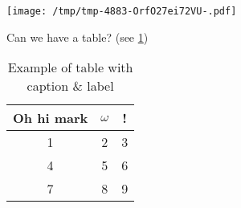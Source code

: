 \documentclass[12pt,russian,a4paper,,fleqn]{extarticle}
\newenvironment{Shaded}{}{}
\newcommand{\AttributeTok}[1]{\textcolor[rgb]{0.49,0.56,0.16}{#1}}
\newcommand{\ControlFlowTok}[1]{\textcolor[rgb]{0.00,0.44,0.13}{\textbf{#1}}}
\newcommand{\DecValTok}[1]{\textcolor[rgb]{0.25,0.63,0.44}{#1}}
\newcommand{\KeywordTok}[1]{\textcolor[rgb]{0.00,0.44,0.13}{\textbf{#1}}}
\newcommand{\NormalTok}[1]{#1}
\newcommand{\OperatorTok}[1]{\textcolor[rgb]{0.40,0.40,0.40}{#1}}
\newcommand{\SpecialCharTok}[1]{\textcolor[rgb]{0.25,0.44,0.63}{#1}}
\newcommand{\StringTok}[1]{\textcolor[rgb]{0.25,0.44,0.63}{#1}}
\let\origfigure=\figure
\let\endorigfigure=\endfigure
\renewenvironment{figure}[1][]{%
\origfigure[H]
}{%
\endorigfigure
}
\theoremstyle{definition}\newtheorem{definition}{Определение}
\theoremstyle{remark}\newtheorem*{remark}{Примечание}
\numberwithin{equation}{section}
\begin{document}
\begin{figure}
\hypertarget{fig:plot-example}{%
\centering
\texttt{[image: /tmp/tmp-4883-OrfO27ei72VU-.pdf]}
\caption{Example of plot with caption \& label}\label{fig:plot-example}
}
\end{figure}

Can we have a table? (see \ref{table:example-table})

\begin{Shaded}
\end{Shaded}

\begin{table}[ht]
\centering
\begin{tabular}[t]{|c|c|c|}
\hline
Oh hi mark & $\omega$ & !\\
\hline
1 & 2 & 3\\
\hline
4 & 5 & 6\\
\hline
7 & 8 & 9\\
\hline
\end{tabular}
\caption{
\label{table:example-table}
Example of table with caption \& label}
\end{table}
\end{document}
